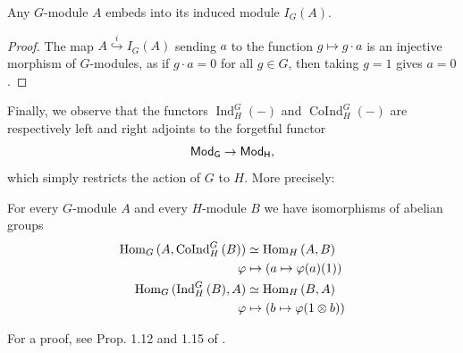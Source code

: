 \documentclass[a4paper, oneside]{memoir}
\begin{document}
\begin{proposition}
    Any $G$-module $A$ embeds into its induced module $I_G(A)$.
\end{proposition}

\begin{proof}
    The map $A\overset{i}{\hookrightarrow} I_G(A)$ sending $a$ to the function $g\mapsto g\cdot a$ is an injective morphism of $G$-modules, as if $g\cdot a = 0 $ for all $g\in G$, then taking $g=1$ gives $a=0$.
\end{proof}

\noindent Finally, we observe that the functors $\operatorname{Ind}^G_H{(-)}$ and $\operatorname{CoInd}^G_H{(-)}$ are respectively left and right adjoints to the forgetful functor
\[
    \mathsf{Mod}_\mathsf{G}\to\mathsf{Mod}_\mathsf{H},
\]
which simply restricts the action of $G$ to $H$. More precisely:

\begin{proposition}
    For every $G$-module $A$ and every $H$-module $B$ we have isomorphisms of abelian groups
    \begin{align}
        \operatorname{Hom}_G{(A,\operatorname{CoInd}^G_H{(B)})} & \simeq \operatorname{Hom}_H{(A,B)}\label{eq:CoIndAdj}                    \\
        \varphi                                   & \mapsto (a\mapsto \varphi(a)(1)) \nonumber                 \\
        \operatorname{Hom}_G{(\operatorname{Ind}^G_H{(B)},A)}   & \simeq \operatorname{Hom}_H{(B,A)}\label{eq:IndAdj}                      \\
        \varphi                                   & \mapsto \left(b\mapsto \varphi(1\otimes b)\right)\nonumber
    \end{align}
\end{proposition}
\noindent For a proof, see Prop. 1.12 and 1.15 of \cite{Harari}.
\end{document}
